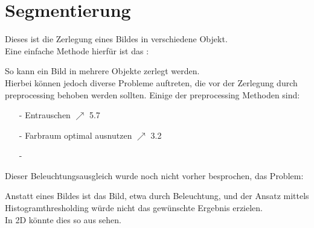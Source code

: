     \section{Segmentierung}

Dieses ist die Zerlegung eines Bildes in verschiedene Objekt.\\
Eine einfache Methode hierfür ist das :
\begin{center}
\end{center}
So kann ein Bild in mehrere Objekte zerlegt werden.\\
Hierbei können jedoch diverse Probleme auftreten, die vor der Zerlegung durch preprocessing behoben werden sollten. Einige der preprocessing Methoden sind:
\begin{enumerate}
  \item[-] Entrauschen $\nearrow$ 5.7
  \item[-] Farbraum optimal ausnutzen $\nearrow$ 3.2
  \item[-] 
\end{enumerate}
Dieser Beleuchtungsausgleich wurde noch nicht vorher besprochen, das Problem:

\begin{center}
\end{center}

Anstatt eines  Bildes ist das Bild, etwa durch Beleuchtung,  und der Ansatz mittels Histogramthresholding würde nicht das gewünschte Ergebnis erzielen.\\

In 2D könnte dies so aus sehen.

